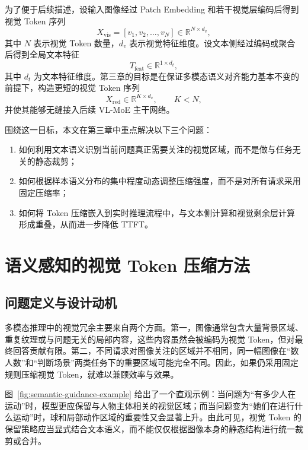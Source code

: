 为了便于后续描述，设输入图像经过 Patch Embedding 和若干视觉层编码后得到视觉 Token 序列
\begin{equation}
X_{\mathrm{vis}} = [v_1, v_2, \ldots, v_N] \in \mathbb{R}^{N \times d_v},
\end{equation}
其中 $N$ 表示视觉 Token 数量，$d_v$ 表示视觉特征维度。设文本侧经过编码或聚合后得到全局文本特征
\begin{equation}
T_{\mathrm{feat}} \in \mathbb{R}^{1 \times d_t},
\end{equation}
其中 $d_t$ 为文本特征维度。第三章的目标是在保证多模态语义对齐能力基本不变的前提下，构造更短的视觉 Token 序列
\begin{equation}
X_{\mathrm{red}} \in \mathbb{R}^{K \times d_v}, \qquad K < N,
\end{equation}
并使其能够无缝接入后续 VL-MoE 主干网络。

围绕这一目标，本文在第三章中重点解决以下三个问题：
\begin{enumerate}
\item 如何利用文本语义识别当前问题真正需要关注的视觉区域，而不是做与任务无关的静态裁剪；
\item 如何根据样本语义分布的集中程度动态调整压缩强度，而不是对所有请求采用固定压缩率；
\item 如何将 Token 压缩嵌入到实时推理流程中，与文本侧计算和视觉剩余层计算形成重叠，从而进一步降低 TTFT。
\end{enumerate}


\section{语义感知的视觉 Token 压缩方法}
\subsection{问题定义与设计动机}
多模态推理中的视觉冗余主要来自两个方面。第一，图像通常包含大量背景区域、重复纹理或与问题无关的局部内容，这些内容虽然会被编码为视觉 Token，但对最终回答贡献有限。第二，不同请求对图像关注的区域并不相同，同一幅图像在“数人数”和“判断场景”两类任务下的重要区域可能完全不同。因此，如果仍采用固定规则压缩视觉 Token，就难以兼顾效率与效果。

图~\ref{fig:semantic-guidance-example} 给出了一个直观示例：当问题为“有多少人在运动”时，模型更应保留与人物主体相关的视觉区域；而当问题变为“她们在进行什么运动”时，球和局部动作区域的重要性又会显著上升。由此可见，视觉 Token 的保留策略应当显式结合文本语义，而不能仅仅根据图像本身的静态结构进行统一裁剪或合并。

